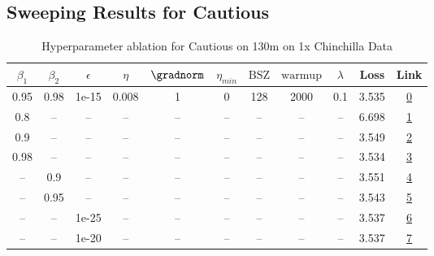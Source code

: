 \subsection{Sweeping Results for Cautious}%
\begin{table}[H]
\centering
\caption{Hyperparameter ablation for Cautious on 130m on 1x Chinchilla Data}
\label{tab:ablation_cautious_130m_on_1x_chinchilla_data}
\begin{tabular}{ccccccccccc}
\toprule
$\beta_1$ & $\beta_2$ & $\epsilon$ & $\eta$ & $\gradnorm$ & $\eta_{min}$ & $\mathrm{BSZ}$ & $\mathrm{warmup}$ & $\lambda$ & Loss & Link \\
\midrule
0.95 & 0.98 & 1e-15 & 0.008 & 1 & 0 & 128 & 2000 & 0.1 & 3.535 & \href{https://wandb.ai/stanford-mercury/optimizer-scaling/runs/sweep-130m-2B-cautious7b0572lr0.008-wd0.1-minlr0-warmup2000-b10.-085cb0}{0} \\
\midrule
0.8 & -- & -- & -- & -- & -- & -- & -- & -- & 6.698 & \href{https://wandb.ai/stanford-mercury/optimizer-scaling/runs/sweep-130m-2B-cautious90e2dblr0.008-wd0.1-minlr0-warmup2000-b10.-3a5e65}{1} \\
0.9 & -- & -- & -- & -- & -- & -- & -- & -- & 3.549 & \href{https://wandb.ai/stanford-mercury/optimizer-scaling/runs/sweep-130m-2B-cautious5fbf2flr0.008-wd0.1-minlr0-warmup2000-b10.-8d12f3}{2} \\
0.98 & -- & -- & -- & -- & -- & -- & -- & -- & 3.534 & \href{https://wandb.ai/stanford-mercury/optimizer-scaling/runs/sweep-130m-2B-cautiousd41969lr0.008-wd0.1-minlr0-warmup2000-b10.-7d014c}{3} \\
-- & 0.9 & -- & -- & -- & -- & -- & -- & -- & 3.551 & \href{https://wandb.ai/stanford-mercury/optimizer-scaling/runs/sweep-130m-2B-cautious87fa48lr0.008-wd0.1-minlr0-warmup2000-b10.-dff836}{4} \\
-- & 0.95 & -- & -- & -- & -- & -- & -- & -- & 3.543 & \href{https://wandb.ai/stanford-mercury/optimizer-scaling/runs/sweep-130m-2B-cautious04bad0lr0.008-wd0.1-minlr0-warmup2000-b10.-15c6af}{5} \\
-- & -- & 1e-25 & -- & -- & -- & -- & -- & -- & 3.537 & \href{https://wandb.ai/stanford-mercury/optimizer-scaling/runs/sweep-130m-2B-cautious2a7d1dlr0.008-wd0.1-minlr0-warmup2000-b10.-ff7d5f}{6} \\
-- & -- & 1e-20 & -- & -- & -- & -- & -- & -- & 3.537 & \href{https://wandb.ai/stanford-mercury/optimizer-scaling/runs/sweep-130m-2B-cautious24891dlr0.008-wd0.1-minlr0-warmup2000-b10.-883f16}{7} \\

\end{tabular}
\end{table}
